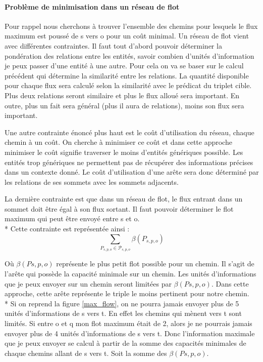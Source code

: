 \paragraph{Problème de minimisation dans un réseau de flot}

Pour rappel nous cherchons à trouver l'ensemble des chemins pour lesquels le flux maximum est poussé de s vers o pour un coût minimal. Un réseau de flot vient avec différentes contraintes. Il faut tout d'abord pouvoir déterminer la pondération des relations entre les entités, savoir combien d'unités d'information je peux passer d'une entité à une autre. Pour cela on va se baser sur le calcul précédent qui détermine la similarité entre les relations. La quantité disponible pour chaque flux sera calculé selon la similarité avec le prédicat du triplet cible. Plus deux relations seront similaire et plus le flux alloué sera important. En outre, plus un fait sera général (plus il aura de relations), moins son flux sera important.

Une autre contrainte énoncé plus haut est le coût d'utilisation du réseau, chaque chemin à un coût. On cherche à minimiser ce coût et dans cette approche minimiser le coût signifie traverser le moins d'entités génériques possible. Les entités trop génériques ne permettent pas de récupérer des informations précises dans un contexte donné. Le coût d'utilisation d'une arête sera donc déterminé par les relations de ses sommets avec les sommets adjacents.

La dernière contrainte est que dans un réseau de flot, le flux entrant dans un sommet doit être égal à son flux sortant. Il faut pouvoir déterminer le flot maximum qui peut être envoyé entre s et o.
\\*
Cette contrainte est représentée ainsi :
\begin{equation}
   \sum\limits_{P_{s,p,o}  \in  \mathcal{P}_{s,p,o}}  \beta(P_{s,p,o})
\end{equation}

Où $ \beta(P s,p,o) $ représente le plus petit flot possible pour un chemin. Il s'agit de l'arête qui possède la capacité minimale sur un chemin. Les unités d'informations que je peux envoyer sur un chemin seront limitées par $ \beta(P s,p,o) $. Dans cette approche, cette arête représente le triple le moins pertinent pour notre chemin.
\\*
Si on reprend la figure \ref{max_flow}, on ne pourra jamais envoyer plus de 5 unités d'informations de s vers t. En effet les chemins qui mènent vers t sont limités. Si entre o et q mon flot maximum était de 2, alors je ne pourrais jamais envoyer plus de 4 unités d'informations de s vers t. Donc l'information maximale que je peux envoyer se calcul à partir de la somme des capacités minimales de chaque chemins allant de s vers t. Soit la somme des $ \beta(P s,p,o) $.

